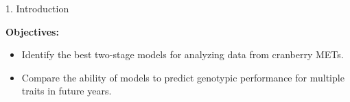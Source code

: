 \documentclass[final]{beamer}
\newlength{\onecolwid}
\begin{document}
\begin{frame}[t]
\begin{columns}[t]
\begin{column}{\onecolwid}
\begin{block}{1. Introduction}
\vspace{0.5cm}

\textbf{Objectives:}
\begin{itemize}
  \item Identify the best two-stage models for analyzing data from cranberry METs.
  \item Compare the ability of models to predict genotypic performance for multiple traits in future years.
\end{itemize}


\end{block}



%
%
%
%
%




%
%
%
%
%



\end{column}
\end{columns}
\end{frame}
\end{document}
